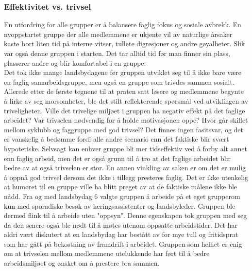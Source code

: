 \subsubsection{Effektivitet vs. trivsel}
En utfordring for alle grupper er å balansere faglig fokus og sosiale avbrekk.
En nyoppstartet gruppe der alle medlemmene er ukjente vil av naturlige årsaker kaste bort liten tid på interne vitser, tullete digresjoner og andre gøyalheter.
Slik var også denne gruppen i starten. Det tar alltid tid før man finner sin plass, plasserer andre og blir komfortabel i en gruppe. 
\\
Det tok ikke mange landsbydagene før gruppen utviklet seg til å ikke bare være en faglig samarbeidsgruppe, men også en gruppe som trivdes sammen sosialt. 
Allerede etter de første tegnene til at praten satt løsere og medlemmene begynte å lirke av seg morsomheter, ble det stilt reflekterende spørsmål ved utviklingen av triveligheten.
Ville det trivelige miljøet i gruppen ha negativ effekt på det faglige arbeidet?
Var trivselen nødvendig for å holde motivasjonen oppe? 
Hvor går skillet mellom syklubb og faggruppe med god trivsel?
Det finnes ingen fasitsvar, og det er vanskelig å bedømme fordi alle andre scenario enn det faktiske blir svært hypotetiske.
Selvsagt kan enhver gruppe bli mer tidseffektiv ved å forby alt annet enn faglig arbeid, men det er også grunn til å tro at det faglige arbeidet blir bedre av at også trivselen er stor.
En annen vinkling av saken er om det er mulig å oppnå god trivsel dersom det ikke i tillegg presteres faglig.
Det er ikke utenkelig at humøret til en gruppe ville ha blitt preget av at de faktiske målene ikke ble nådd.
Fra og med landsbydag 6 valgte gruppen å arbeide på et eget grupperom kun med sporadiske besøk av læringsassistenter og landsbyleder.
Gruppen ble dermed flink til å arbeide uten "oppsyn".
Denne egenskapen tok gruppen med seg da den senere også ble nødt til å møtes utenom oppsatte arbeidstider.
Det har aldri vært diskutert at en landsbydag har bestått av for mye tull og fritidsprat som har gått på bekostning av framdrift i arbeidet.
Gruppen som helhet er enig om at trivselen mellom medlemmene utelukkende har ført til å bedre arbeidsmiljøet og ønsket om å prestere bra sammen.
\\